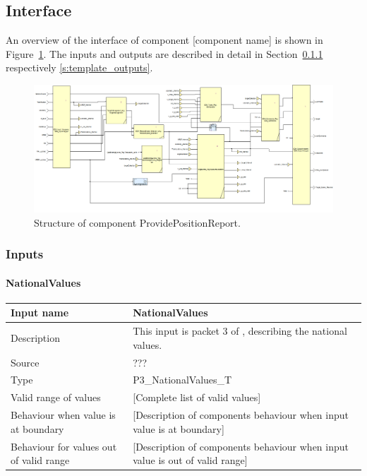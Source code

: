 \subsection{Interface}

An overview of the interface of component [component name] is shown in Figure~\ref{f:ssv}. The inputs and outputs are described in detail in Section~\ref{s:template_inputs} respectively \ref{s:template_outputs}.

\begin{figure}
\centering
\includegraphics[width=0.95\textheight, angle=90]{../images/speedsupervision.png}
\caption{Structure of component ProvidePositionReport.}\label{f:ssv}
\end{figure}



\subsubsection{Inputs}\label{s:template_inputs}

\paragraph{NationalValues}

\begin{longtable}{p{}p{}}
\toprule
Input name				& NationalValues \\
\midrule
Description				& This input is packet 3 of \cite[Chapt.~8]{subset-026}, describing the national values.  \\
\midrule
Source					& ??? \\ 
\midrule
Type					& P3\_NationalValues\_T \\
\midrule
Valid range of values	& [Complete list of valid values] \\
\midrule
Behaviour when value is at boundary	& [Description of components behaviour when input value is at boundary] \\
\midrule
Behaviour for values out of valid range	& [Description of components behaviour when input value is out of valid range] \\
\bottomrule
\end{longtable}


